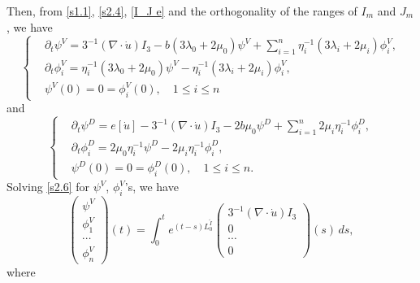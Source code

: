 \documentclass[a4paper,12pt]{article}
\newtheorem{a priori condition}[Th]{A priori condition}
\begin{document}
\noindent
Then, from \eqref{s1.1}, \eqref{s2.4},  \eqref{I_J e} and the orthogonality of the ranges of $I_m$ and $J_m$, we have \begin{equation}\label{s2.6}
\left\{
\begin{aligned}
&\partial_t\psi^V=3^{-1}(\nabla\cdot\dot{u}) I_3-b(3\lambda_0+2\mu_0)\psi^V+\sum_{i=1}^n\eta_i^{-1}(3\lambda_i+2\mu_i)\phi_i^V,\\
&\partial_t\phi_i^V=\eta_i^{-1}(3\lambda_0+2\mu_0)\psi^V-\eta_i^{-1}(3\lambda_i+2\mu_i)\phi_i^V,\\
&\psi^V(0)=0=\phi_i^V(0),\quad 1\leq i\leq n
\end{aligned}
\right.
\end{equation}
and
\begin{equation}\label{s2.7}
\left\{
\begin{aligned}
&\partial_t\psi^D=e[\dot{u}]-3^{-1}(\nabla\cdot\dot{u}) I_3-2b\mu_0\psi^D+\sum_{i=1}^n2\mu_i\eta_i^{-1}\phi_i^D,\\
&\partial_t\phi_i^D=2\mu_0\eta_i^{-1}\psi^D-2\mu_i\eta_i^{-1}\phi_i^D,\\
&\psi^D(0)=0=\phi_i^D(0),\quad 1\leq i\leq n.
\end{aligned}
\right.
\end{equation}
Solving \eqref{s2.6} for $\psi^V$, $\phi_i^V$'s, we have 
\begin{equation}\label{s2.8}
\begin{pmatrix}
\psi^V \\
\phi_1^V\\
\cdots  \\
\phi_n^V
\end{pmatrix}
(t)=\int_0^t e^{(t-s)L_0^{\tilde I}}
\begin{pmatrix}
3^{-1}(\nabla\cdot\dot{u})I_3 \\
0\\
\cdots\\
0
\end{pmatrix}
(s)\, ds,
\end{equation}
where
\end{document}

